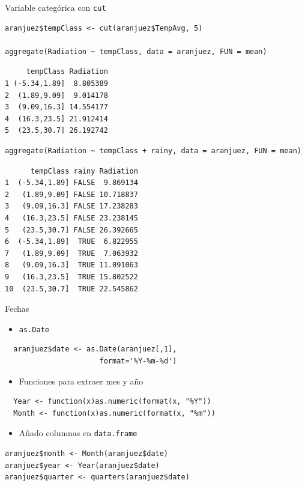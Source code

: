 \documentclass[xcolor={usenames,svgnames,dvipsnames}]{beamer}
\begin{document}
\begin{frame}[fragile,label=sec-5-2-2]{Variable categórica con \texttt{cut}}
 \lstset{language=R,label= ,caption= ,numbers=none}
\begin{lstlisting}
aranjuez$tempClass <- cut(aranjuez$TempAvg, 5)

aggregate(Radiation ~ tempClass, data = aranjuez, FUN = mean)
\end{lstlisting}

\begin{verbatim}
     tempClass Radiation
1 (-5.34,1.89]  8.805389
2  (1.89,9.09]  9.014178
3  (9.09,16.3] 14.554177
4  (16.3,23.5] 21.912414
5  (23.5,30.7] 26.192742
\end{verbatim}

\lstset{language=R,label= ,caption= ,numbers=none}
\begin{lstlisting}
aggregate(Radiation ~ tempClass + rainy, data = aranjuez, FUN = mean)
\end{lstlisting}

\begin{verbatim}
      tempClass rainy Radiation
1  (-5.34,1.89] FALSE  9.869134
2   (1.89,9.09] FALSE 10.718837
3   (9.09,16.3] FALSE 17.238283
4   (16.3,23.5] FALSE 23.238145
5   (23.5,30.7] FALSE 26.392665
6  (-5.34,1.89]  TRUE  6.822955
7   (1.89,9.09]  TRUE  7.063932
8   (9.09,16.3]  TRUE 11.091063
9   (16.3,23.5]  TRUE 15.802522
10  (23.5,30.7]  TRUE 22.545862
\end{verbatim}
\end{frame}

\begin{frame}[fragile,label=sec-5-2-3]{Fechas}
 \begin{itemize}
\item \texttt{as.Date}
\end{itemize}
\lstset{language=R,label= ,caption= ,numbers=none}
\begin{lstlisting}
  aranjuez$date <- as.Date(aranjuez[,1],
                      format='%Y-%m-%d')
\end{lstlisting}

\begin{itemize}
\item Funciones para extraer mes y año
\end{itemize}
\lstset{language=R,label= ,caption= ,numbers=none}
\begin{lstlisting}
  Year <- function(x)as.numeric(format(x, "%Y"))
  Month <- function(x)as.numeric(format(x, "%m"))
\end{lstlisting}

\begin{itemize}
\item Añado columnas en \texttt{data.frame}
\end{itemize}
\lstset{language=R,label= ,caption= ,numbers=none}
\begin{lstlisting}
aranjuez$month <- Month(aranjuez$date)
aranjuez$year <- Year(aranjuez$date)
aranjuez$quarter <- quarters(aranjuez$date)
\end{lstlisting}
\end{frame}
\end{document}
